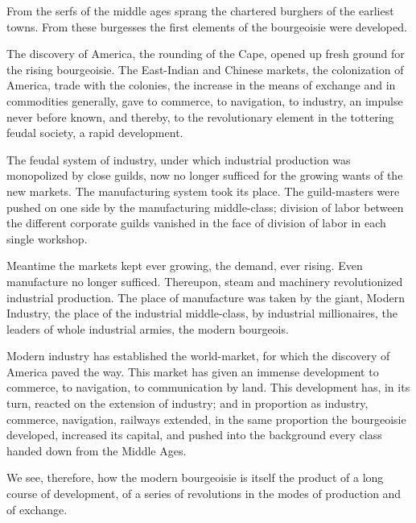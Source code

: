 From the serfs of the middle ages sprang the chartered burghers of the earliest towns. From these burgesses the first elements of the bourgeoisie were developed.

The discovery of America, the rounding of the Cape, opened up fresh ground for the rising bourgeoisie. The East-Indian and Chinese markets, the colonization of America, trade with the colonies, the increase in the means of exchange and in commodities generally, gave to commerce, to navigation, to industry, an impulse never before known, and thereby, to the revolutionary element in the tottering feudal society, a rapid development.

The feudal system of industry, under which industrial production was monopolized by close guilds, now no longer sufficed for the growing wants of the new markets. The manufacturing system took its place. The guild-masters were pushed on one side by the manufacturing middle-class; division of labor between the different corporate guilds vanished in the face of division of labor in each single workshop.

Meantime the markets kept ever growing, the demand, ever rising. Even manufacture no longer sufficed. Thereupon, steam and machinery revolutionized industrial production. The place of manufacture was taken by the giant, Modern Industry, the place of the industrial middle-class, by industrial millionaires, the leaders of whole industrial armies, the modern bourgeois.

Modern industry has established the world-market, for which the discovery of America paved the way. This market has given an immense development to commerce, to navigation, to communication by land. This development has, in its turn, reacted on the extension of industry; and in proportion as industry, commerce, navigation, railways extended, in the same proportion the bourgeoisie developed, increased its capital, and pushed into the background every class handed down from the Middle Ages.

We see, therefore, how the modern bourgeoisie is itself the product of a long course of development, of a series of revolutions in the modes of production and of exchange.

